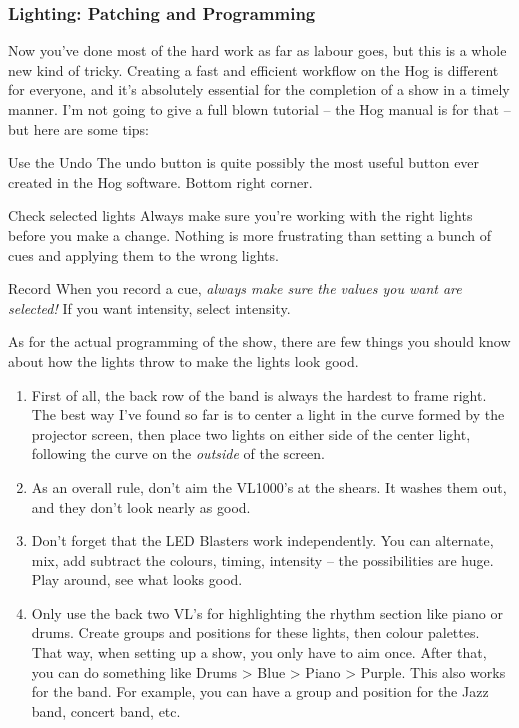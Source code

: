 \documentclass[letterpaper,10pt,oneside,headsepline]{scrreprt}
\begin{document}
\subsubsection{Lighting: Patching and Programming}
Now you've done most of the hard work as far as labour goes, but this is a whole new kind of tricky. Creating a fast and efficient workflow on the Hog is different for everyone, and it's absolutely essential for the completion of a show in a timely manner. I'm not going to give a full blown tutorial -- the Hog manual is for that -- but here are some tips:\\

\begin{compactdesc}
\item[Use the Undo] The undo button is quite possibly the most useful button ever created in the Hog software. Bottom right corner.
\item[Check selected lights] Always make sure you're working with the right lights before you make a change. Nothing is more frustrating than setting a bunch of cues and applying them to the wrong lights.
\item[Record] When you record a cue, \textit{always make sure the values you want are selected!} If you want intensity, select intensity.\\
\end{compactdesc}

As for the actual programming of the show, there are few things you should know about how the lights throw to make the lights look good. 

\begin{enumerate}
\item First of all, the back row of the band is always the hardest to frame right. The best way I've found so far is to center a light in the curve formed by the projector screen, then place two lights on either side of the center light, following the curve on the \textit{outside} of the screen.
\item As an overall rule, don't aim the VL1000's at the shears. It washes them out, and they don't look nearly as good.
\item Don't forget that the LED Blasters work independently. You can alternate, mix, add subtract the colours, timing, intensity -- the possibilities are huge. Play around, see what looks good. 
\item Only use the back two VL's for highlighting the rhythm section like piano or drums. Create groups and positions for these lights, then colour palettes. That way, when setting up a show, you only have to aim once. After that, you can do something like Drums > Blue > Piano > Purple. This also works for the band. For example, you can have a group and position for the Jazz band, concert band, etc.
\end{enumerate}
\end{document}
